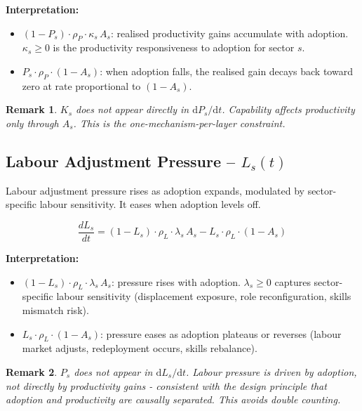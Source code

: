 \documentclass[11pt,a4paper]{article}
\newtheorem{remark}{Remark}
\begin{document}
\textbf{Interpretation:}
\begin{itemize}
  \item $(1 - P_s)\cdot\rho_P\cdot\kappa_s\, A_s$: realised productivity gains accumulate with adoption. $\kappa_s \geq 0$ is the productivity responsiveness to adoption for sector $s$.
  \item $P_s\cdot\rho_P\cdot(1 - A_s)$: when adoption falls, the realised gain decays back toward zero at rate proportional to $(1 - A_s)$.
\end{itemize}

\begin{remark}
$K_s$ does not appear directly in $\mathrm{d}P_s/\mathrm{d}t$. Capability affects productivity \emph{only through} $A_s$. This is the one-mechanism-per-layer constraint.
\end{remark}

\subsection{Labour Adjustment Pressure -- \texorpdfstring{$L_s(t)$}{Ls(t)}}

Labour adjustment pressure rises as adoption expands, modulated by sector-specific labour sensitivity. It eases when adoption levels off.

\begin{equation}
\boxed{
\frac{dL_s}{dt}
= (1 - L_s)\cdot\rho_L\cdot\lambda_s\, A_s
- L_s\cdot\rho_L\cdot(1 - A_s)
}
\label{eq:Ls}
\end{equation}

\textbf{Interpretation:}
\begin{itemize}
  \item $(1 - L_s)\cdot\rho_L\cdot\lambda_s\, A_s$: pressure rises with adoption. $\lambda_s \geq 0$ captures sector-specific labour sensitivity (displacement exposure, role reconfiguration, skills mismatch risk).
  \item $L_s\cdot\rho_L\cdot(1 - A_s)$: pressure eases as adoption plateaus or reverses (labour market adjusts, redeployment occurs, skills rebalance).
\end{itemize}

\begin{remark}
$P_s$ does not appear in $\mathrm{d}L_s/\mathrm{d}t$. Labour pressure is driven by adoption, not directly by productivity gains - consistent with the design principle that adoption and productivity are causally separated. This avoids double counting.
\end{remark}
\end{document}
